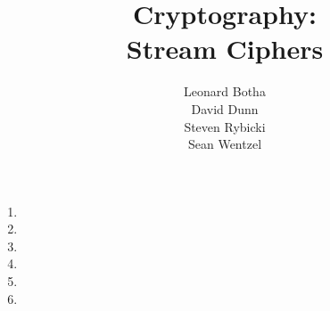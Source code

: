 \documentclass[12pt,a4paper]{article}
\title{{\bf Cryptography:}\\
Stream Ciphers}
\author{Leonard Botha \\
David Dunn \\
Steven Rybicki\\
Sean Wentzel}
\begin{document}
\maketitle
\begin{enumerate}
\item 
\item 
\item 
\item 
\item 
\item 
\end{enumerate}

\end{document}
